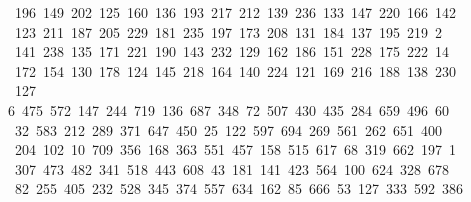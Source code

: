 \begin{tabbing}
\>\ 196\ 149\ 202\ 125\ 160\ 136\ 193\ 217\ 212\ 139\ 236\ 133\ 147\ 220\ 166\ 142\ \\[0pt]
\ 123\ 211\ 187\ 205\ 229\ 181\ 235\ 197\ 173\ 208\ 131\ 184\ 137\ 195\ 219\ 2\\[0pt]
\ 141\ 238\ 135\ 171\ 221\ 190\ 143\ 232\ 129\ 162\ 186\ 151\ 228\ 175\ 222\ 14\\[0pt]
\ 172\ 154\ 130\ 178\ 124\ 145\ 218\ 164\ 140\ 224\ 121\ 169\ 216\ 188\ 138\ 230\\[0pt]
\>\ 127\ \\[0pt]
6\ 475\ 572\ 147\ 244\ 719\ 136\ 687\ 348\ 72\ 507\ 430\ 435\ 284\ 659\ 496\ 60\ \\[0pt]
\ 32\ 583\ 212\ 289\ 371\ 647\ 450\ 25\ 122\ 597\ 694\ 269\ 561\ 262\ 651\ 400\\[0pt]
\>\ 204\ 102\ 10\ 709\ 356\ 168\ 363\ 551\ 457\ 158\ 515\ 617\ 68\ 319\ 662\ 197\ 1\\[0pt]
\ 307\ 473\ 482\ 341\ 518\ 443\ 608\ 43\ 181\ 141\ 423\ 564\ 100\ 624\ 328\ 678\\[0pt]
\>\ 82\ 255\ 405\ 232\ 528\ 345\ 374\ 557\ 634\ 162\ 85\ 666\ 53\ 127\ 333\ 592\ 386\\[0pt]

\end{tabbing}
